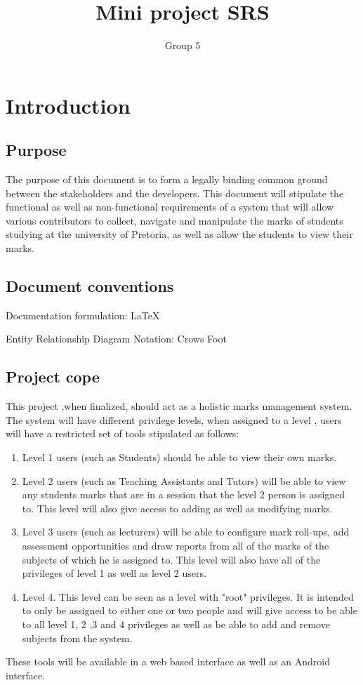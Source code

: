 \documentclass[10pt,a4paper]{article}
\author{Group 5}
\title{Mini project SRS}
\begin{document}
\tableofcontents
\pagebreak
\section{Introduction}
\subsection{Purpose}
The purpose of this document is to form a legally binding common ground between the stakeholders and the developers. This document will stipulate the functional as well as non-functional requirements of a system that will allow various contributors to collect, navigate and manipulate the marks of students studying at the university of Pretoria, as well as allow the students to view their marks.
\subsection{Document conventions}
\begin{description}
\item Documentation formulation: LaTeX
\item Entity Relationship Diagram Notation: Crows Foot 
\end{description}
\subsection{Project cope}
This project ,when finalized, should act as a holistic marks management system. The system will have different privilege levels, when assigned to a level , users will have a restricted set of tools stipulated as follows: 
\begin{enumerate}
\item Level 1 users (such as Students) should be able to view their own marks.
\item Level 2 users (such as Teaching Assistants and Tutors) will be able to view any students marks that are in a session that the level 2 person is assigned to. This level will also give access to adding as well as modifying marks.
\item Level 3 users (such as lecturers) will be able to configure mark roll-ups, add assessment opportunities and draw reports from all of the marks of the subjects of which he is assigned to. This level will also have all of the privileges of level 1 as well as level 2 users.
\item Level 4. This level can be seen as a level with "root" privileges. It is intended to only be assigned to either one or two people and will give access to be able to all level 1, 2 ,3 and 4 privileges as well as be able to add and remove subjects from the system. 
\end{enumerate}
These tools will be available in a web based interface as well as an Android interface.
\end{document}
